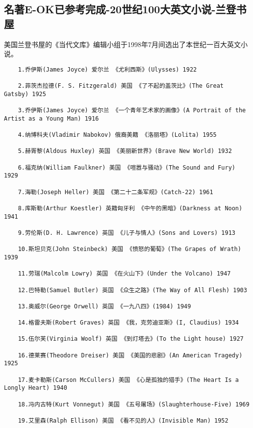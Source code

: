 \documentclass[UTF8]{../RepresentationUniverse}
\begin{document}
\subsection{名著E-OK已参考完成-20世纪100大英文小说-兰登书屋}
美国兰登书屋的《当代文库》编辑小组于1998年7月间选出了本世纪一百大英文小说。
\begin{lstlisting}
    1.乔伊斯(James Joyce) 爱尔兰 《尤利西斯》(Ulysses) 1922

    2.菲茨杰拉德(F. S. Fitzgerald) 美国 《了不起的盖茨比》(The Great Gatsby) 1925
    
    3.乔伊斯(James Joyce) 爱尔兰 《一个青年艺术家的画像》(A Portrait of the Artist as a Young Man) 1916
    
    4.纳博科夫(Vladimir Nabokov) 俄裔美籍 《洛丽塔》(Lolita) 1955
    
    5.赫胥黎(Aldous Huxley) 英国 《美丽新世界》(Brave New World) 1932
    
    6.福克纳(William Faulkner) 美国 《喧嚣与骚动》(The Sound and Fury) 1929
    
    7.海勒(Joseph Heller) 美国 《第二十二条军规》(Catch-22) 1961
    
    8.库斯勒(Arthur Koestler) 英籍匈牙利 《中午的黑暗》(Darkness at Noon) 1941
    
    9.劳伦斯(D. H. Lawrence) 英国 《儿子与情人》(Sons and Lovers) 1913
    
    10.斯坦贝克(John Steinbeck) 美国 《愤怒的葡萄》(The Grapes of Wrath) 1939
    
    11.劳瑞(Malcolm Lowry) 英国 《在火山下》(Under the Volcano) 1947
    
    12.巴特勒(Samuel Butler) 英国 《众生之路》(The Way of All Flesh) 1903
    
    13.奥威尔(George Orwell) 英国 《一九八四》(1984) 1949
    
    14.格雷夫斯(Robert Graves) 英国 《我，克劳迪亚斯》(I, Claudius) 1934
    
    15.伍尔芙(Virginia Woolf) 英国 《到灯塔去》(To the Light house) 1927
    
    16.德莱赛(Theodore Dreiser) 美国 《美国的悲剧》(An American Tragedy) 1925
    
    17.麦卡勒斯(Carson McCullers) 美国 《心是孤独的猎手》(The Heart Is a Longly Heart) 1940
    
    18.冯内古特(Kurt Vonnegut) 美国 《五号屠场》(Slaughterhouse-Five) 1969
    
    19.艾里森(Ralph Ellison) 美国 《看不见的人》(Invisible Man) 1952
    

\end{lstlisting}
\end{document}
